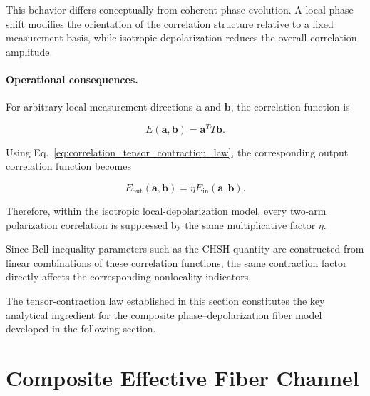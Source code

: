 \medskip

This behavior differs conceptually from coherent phase evolution. A local phase shift modifies the orientation of the correlation structure relative to a fixed measurement basis, while isotropic depolarization reduces the overall correlation amplitude.

\medskip

\paragraph{Operational consequences.}

For arbitrary local measurement directions \( \mathbf{a} \) and \( \mathbf{b} \), the correlation function is

\[
E(\mathbf{a},\mathbf{b})
=
\mathbf{a}^{T}
T
\mathbf{b}.
\]

Using Eq.~\eqref{eq:correlation_tensor_contraction_law}, the corresponding output correlation function becomes

\begin{equation}
E_{\mathrm{out}}(\mathbf{a},\mathbf{b})
=
\eta
E_{\mathrm{in}}(\mathbf{a},\mathbf{b}).
\label{eq:arbitrary_axis_correlation_contraction}
\end{equation}

Therefore, within the isotropic local-depolarization model, every two-arm polarization correlation is suppressed by the same multiplicative factor \( \eta \).

\medskip

Since Bell-inequality parameters such as the CHSH quantity are constructed from linear combinations of these correlation functions, the same contraction factor directly affects the corresponding nonlocality indicators.

\medskip

The tensor-contraction law established in this section constitutes the key analytical ingredient for the composite phase--depolarization fiber model developed in the following section.


\section{Composite Effective Fiber Channel}
\label{sec:composite_effective_fiber_channel}

